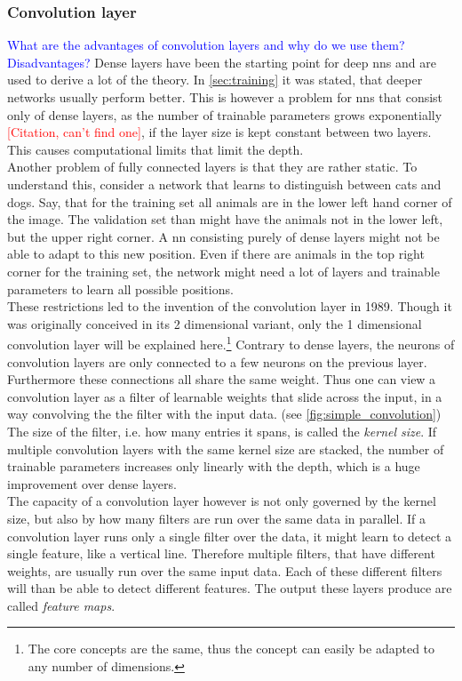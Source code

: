 \subsubsection{Convolution layer}\label{sec:convolution_layer}
\textcolor{blue}{What are the advantages of convolution layers and why do we use them? Disadvantages?}
Dense layers have been the starting point for deep \gls{nns} and are used to derive a lot of the theory. In \autoref{sec:training} it was stated, that deeper networks usually perform better. This is however a problem for \gls{nns} that consist only of dense layers, as the number of trainable parameters grows exponentially \textcolor{red}{[Citation, can't find one]}, if the layer size is kept constant between two layers. This causes computational limits that limit the depth.\\
Another problem of fully connected layers is that they are rather static. To understand this, consider a network that learns to distinguish between cats and dogs. Say, that for the training set all animals are in the lower left hand corner of the image. The validation set than might have the animals not in the lower left, but the upper right corner. A \gls{nn} consisting purely of dense layers might not be able to adapt to this new position. Even if there are animals in the top right corner for the training set, the network might need a lot of layers and trainable parameters to learn all possible positions.\\
These restrictions led to the invention of the convolution layer in 1989. \cite{convolution_layer_invention} Though it was originally conceived in its 2 dimensional variant, only the 1 dimensional convolution layer will be explained here.\footnote{The core concepts are the same, thus the concept can easily be adapted to any number of dimensions.} Contrary to dense layers, the neurons of convolution layers are only connected to a few neurons on the previous layer. Furthermore these connections all share the same weight. Thus one can view a convolution layer as a filter of learnable weights that slide across the input, in a way convolving the the filter with the input data. (see \autoref{fig:simple_convolution})\\
The size of the filter, i.e. how many entries it spans, is called the \emph{kernel size}. If multiple convolution layers with the same kernel size are stacked, the number of trainable parameters increases only linearly with the depth, which is a huge improvement over dense layers.\\
The capacity of a convolution layer however is not only governed by the kernel size, but also by how many filters are run over the same data in parallel. If a convolution layer runs only a single filter over the data, it might learn to detect a single feature, like a vertical line. Therefore multiple filters, that have different weights, are usually run over the same input data. Each of these different filters will than be able to detect different features. The output these layers produce are called \emph{feature maps}.\\
